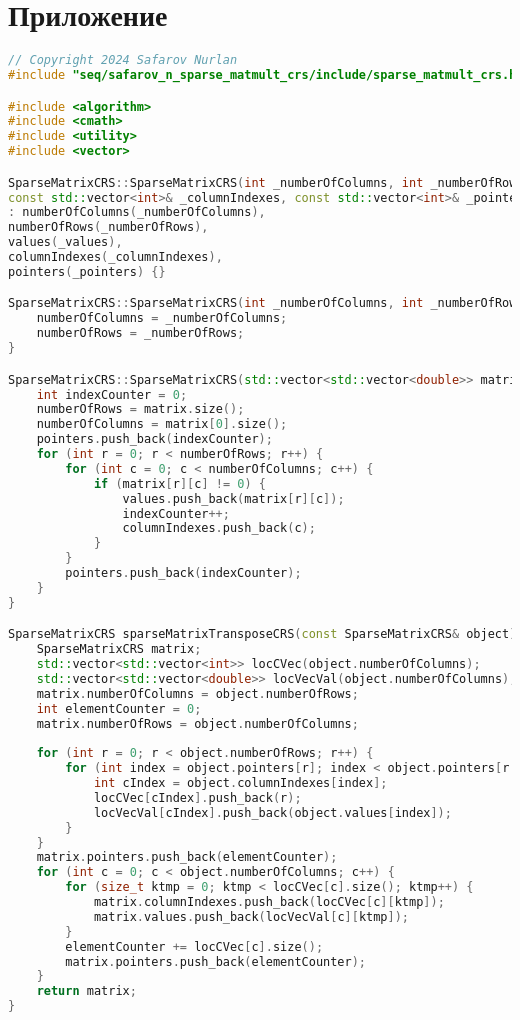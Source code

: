\documentclass[a4paper, 14pt]{article}
\theoremstyle{plain}
\begin{document}
\section*{\centering Приложение}
\begin{lstlisting}[language=C++,caption=Файл sparse\_matmult\_crs.cpp]
// Copyright 2024 Safarov Nurlan
#include "seq/safarov_n_sparse_matmult_crs/include/sparse_matmult_crs.hpp"

#include <algorithm>
#include <cmath>
#include <utility>
#include <vector>

SparseMatrixCRS::SparseMatrixCRS(int _numberOfColumns, int _numberOfRows, const std::vector<double>& _values,
const std::vector<int>& _columnIndexes, const std::vector<int>& _pointers)
: numberOfColumns(_numberOfColumns),
numberOfRows(_numberOfRows),
values(_values),
columnIndexes(_columnIndexes),
pointers(_pointers) {}

SparseMatrixCRS::SparseMatrixCRS(int _numberOfColumns, int _numberOfRows) {
	numberOfColumns = _numberOfColumns;
	numberOfRows = _numberOfRows;
}

SparseMatrixCRS::SparseMatrixCRS(std::vector<std::vector<double>> matrix) {
	int indexCounter = 0;
	numberOfRows = matrix.size();
	numberOfColumns = matrix[0].size();
	pointers.push_back(indexCounter);
	for (int r = 0; r < numberOfRows; r++) {
		for (int c = 0; c < numberOfColumns; c++) {
			if (matrix[r][c] != 0) {
				values.push_back(matrix[r][c]);
				indexCounter++;
				columnIndexes.push_back(c);
			}
		}
		pointers.push_back(indexCounter);
	}
}

SparseMatrixCRS sparseMatrixTransposeCRS(const SparseMatrixCRS& object) {
	SparseMatrixCRS matrix;
	std::vector<std::vector<int>> locCVec(object.numberOfColumns);
	std::vector<std::vector<double>> locVecVal(object.numberOfColumns);
	matrix.numberOfColumns = object.numberOfRows;
	int elementCounter = 0;
	matrix.numberOfRows = object.numberOfColumns;
	
	for (int r = 0; r < object.numberOfRows; r++) {
		for (int index = object.pointers[r]; index < object.pointers[r + 1]; index++) {
			int cIndex = object.columnIndexes[index];
			locCVec[cIndex].push_back(r);
			locVecVal[cIndex].push_back(object.values[index]);
		}
	}
	matrix.pointers.push_back(elementCounter);
	for (int c = 0; c < object.numberOfColumns; c++) {
		for (size_t ktmp = 0; ktmp < locCVec[c].size(); ktmp++) {
			matrix.columnIndexes.push_back(locCVec[c][ktmp]);
			matrix.values.push_back(locVecVal[c][ktmp]);
		}
		elementCounter += locCVec[c].size();
		matrix.pointers.push_back(elementCounter);
	}
	return matrix;
}


\end{lstlisting}
\end{document}
